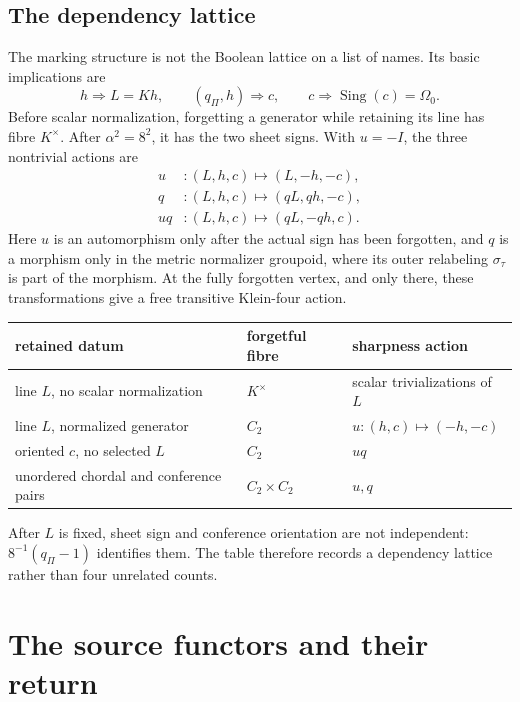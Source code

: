 \documentclass[11pt]{article}
\theoremstyle{definition}
\theoremstyle{remark}
\newcommand{\Sing}{\operatorname{Sing}}
\begin{document}
\subsection{The dependency lattice}

The marking structure is not the Boolean lattice on a list of names.  Its
basic implications are
\[
 h\Rightarrow L=Kh,\qquad (q_\Pi,h)\Rightarrow c,\qquad
 c\Rightarrow\Sing(c)=\Omega_0.
\]
Before scalar normalization, forgetting a generator while retaining its line
has fibre \(K^\times\).  After \(\alpha^2=8^2\), it has the two sheet signs.
With \(u=-I\), the three nontrivial actions are
\[
\begin{aligned}
 u&:(L,h,c)\longmapsto(L,-h,-c),\\
 q&:(L,h,c)\longmapsto(qL,qh,-c),\\
 uq&:(L,h,c)\longmapsto(qL,-qh,c).
\end{aligned}
\]
Here \(u\) is an automorphism only after the actual sign has been forgotten,
and \(q\) is a morphism only in the metric normalizer groupoid, where its
outer relabeling \(\sigma_\tau\) is part of the morphism.
At the fully forgotten vertex, and only there, these transformations give a
free transitive Klein-four action.

\begin{center}
\small
\renewcommand{\arraystretch}{1.18}
\begin{tabular}{@{}p{}p{}p{}@{}}
\toprule
retained datum & forgetful fibre & sharpness action\\
\midrule
line \(L\), no scalar normalization & \(K^\times\) & scalar
  trivializations of \(L\)\\
line \(L\), normalized generator & \(C_2\) & \(u:(h,c)\mapsto(-h,-c)\)\\
oriented \(c\), no selected \(L\) & \(C_2\) & \(uq\)\\
unordered chordal and conference pairs & \(C_2\times C_2\) & \(u,q\)\\
\bottomrule
\end{tabular}
\end{center}

After \(L\) is fixed, sheet sign and conference orientation are not
independent: \(8^{-1}(q_\Pi-1)\) identifies them.  The table therefore
records a dependency lattice rather than four unrelated counts.

\section{The source functors and their return}
\label{sec:source-return}
\end{document}
